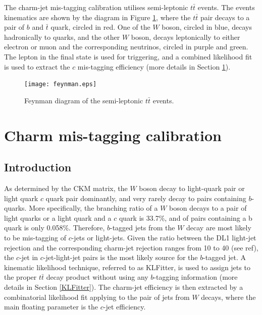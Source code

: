 \documentclass[letterpaper,12pt]{article}
\begin{document}
The charm-jet mis-tagging calibration utilises semi-leptonic $t\bar{t}$ 
events. The events kinematics are shown by the diagram in 
Figure \ref{fig:feynman}, where the $t\bar{t}$ pair decays to a 
pair of $b$ and $\bar{t}$ quark, circled in red. One of the $W$ boson, 
circled in blue, decays hadronically to quarks, and the other $W$ boson, 
decays leptonically to either electron or muon and the corresponding neutrinos, 
circled in purple and green. The lepton in the final state is used for 
triggering, and a combined likelihood fit is used to extract the $c$ mis-tagging 
efficiency (more details in Section \ref{charm mistagging}). 

\begin{figure}[H]
\centering
\begin{minipage}[b]{.45\textwidth}
\centering
\texttt{[image: feynman.eps]}
\end{minipage}
\caption{Feynman diagram of the semi-leptonic $t\bar{t}$ events.}
\label{fig:feynman}
\end{figure}
\section{Charm mis-tagging calibration}
\label{charm mistagging}
\subsection{Introduction}
As determined by the CKM matrix\cite{CKM1}\cite{CKM2}, the $W$ boson decay to light-quark pair or 
light quark $c$ quark pair dominantly, and very rarely decay to pairs containing $b$-quarks. 
More specifically, the branching ratio of a $W$ boson decays to a pair of light quarks or a light quark 
and a $c$ quark is 33.7\%, and of pairs containing a b quark is only 0.058\%\cite{PDG}. 
Therefore, $b$-tagged jets from the $W$ decay are most likely to be mis-tagging of $c$-jets or 
light-jets. Given the ratio between the DL1 light-jet rejection and the corresponding charm-jet rejection 
ranges from 10 to 40 (see ref\cite{ATL-PHYS-PUB-2017-013}), the 
$c$-jet in $c$-jet-light-jet pairs is the most likely source for the 
$b$-tagged jet. A kinematic likelihood technique, referred to as 
KLFitter\cite{ERDMANN201418}, is used to assign jets to the proper $t\bar{t}$ decay product 
without using any $b$-tagging information (more details in Section \ref{KLFitter}). 
The charm-jet efficiency is then extracted by a combinatorial likelihood fit applying to the pair 
of jets from $W$ decays, where the main floating parameter is the $c$-jet efficiency\cite{cjet}. 
\end{document}
